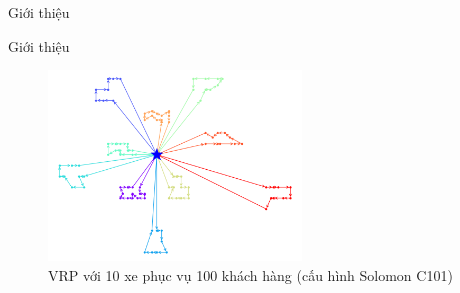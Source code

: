 \begin{frame}{Giới thiệu}
\end{frame}

\begin{frame}{Giới thiệu}
    \begin{figure}[H] %
        \centering %
        \includegraphics[width=0.6\textwidth]{figures/routes_c101.png} 
        \caption{VRP với 10 xe phục vụ 100 khách hàng (cấu hình Solomon C101)} 
    \end{figure}
\end{frame}
